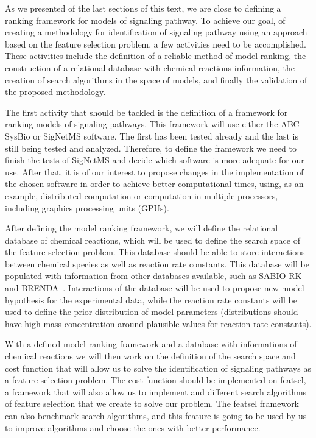 As we presented of the last sections of this text, we are close to
defining a ranking framework for models of signaling pathway. To achieve
our goal, of creating a methodology for identification of signaling 
pathway using an approach based on the feature selection problem, a few
activities need to be accomplished. These activities include the
definition of a reliable method of model ranking, the construction of
a relational database with chemical reactions information, the creation
of search algorithms in the space of models, and finally the validation
of the proposed methodology.

The first activity that should be tackled is the definition of a 
framework for ranking models of signaling pathways. This framework will
use either the ABC-SysBio or SigNetMS software. The first has been 
tested already and the last is still being tested and analyzed. 
Therefore, to define the framework we need to finish the tests of 
SigNetMS and decide which software is more adequate for our use. After
that, it is of our interest to propose changes in the implementation of 
the chosen software in order to achieve better computational times, 
using, as an example, distributed computation or computation in multiple 
processors, including graphics processing units (GPUs).

After defining the model ranking framework, we will define the 
relational database of chemical reactions, which will be used to define 
the search space of the feature selection problem. This database should
be able to store interactions between chemical species as well as 
reaction rate constants.  This database will be populated with 
information from other databases available, such as 
SABIO-RK~\cite{Wittig2011} and BRENDA~\cite{Schomburg2004}. Interactions 
of the database will be used to propose new model hypothesis for the 
experimental data, while the reaction rate constants will be used to 
define the prior distribution of model parameters (distributions should 
have high mass concentration around plausible values for reaction rate 
constants).

With a defined model ranking framework and a database with informations
of chemical reactions we will then work on the definition of the
search space and cost function that will allow us to solve the 
identification of signaling pathways as a feature selection problem.
The cost function should be implemented on featsel, a framework that 
will also allow us to implement and different search algorithms of 
feature selection that we create to solve our problem. The featsel
framework can also benchmark search algorithms, and this feature is 
going to be used by us to improve algorithms and choose the ones with 
better performance.

